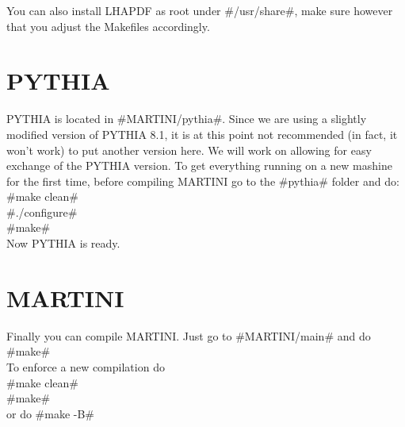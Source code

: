 You can also install LHAPDF as root under #/usr/share#, make sure however that you adjust the Makefiles accordingly.


\section{PYTHIA}
PYTHIA is located in #MARTINI/pythia#. Since we are using a slightly modified version of PYTHIA 8.1, it is at this point not
recommended (in fact, it won't work) to put another version here. We will work on allowing for easy exchange of the PYTHIA
version. To get everything running on a new mashine for the first time, before compiling MARTINI go to the #pythia# folder and do:\\
#make clean#\\
#./configure#\\
#make#\\
Now PYTHIA is ready.

\section{MARTINI}
Finally you can compile MARTINI. Just go to #MARTINI/main# and do\\
#make#\\

To enforce a new compilation do\\
#make clean#\\
#make#\\
or do #make -B#
 


